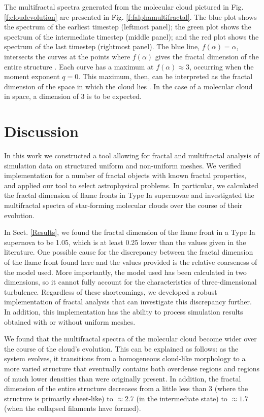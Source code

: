 \documentclass[iop]{emulateapj}
\begin{document}
The multifractal spectra generated from the molecular cloud pictured in Fig. \ref{f:cloudevolution} are presented in Fig. \ref{f:falphamultifractal}. The blue plot shows the spectrum of the earliest timestep (leftmost panel); the green plot shows the spectrum of the intermediate timestep (middle panel); and the red plot shows the spectrum of the last timestep (rightmost panel). The blue line, $f(\alpha) = \alpha $, intersects the curves at the points where $f(\alpha)$ gives the fractal dimension of the entire structure \citep{mandelbrotmultifractal}. Each curve has a maximum at $f(\alpha) \approx 3$, occurring when the moment exponent $q = 0$. This maximum, then, can be interpreted as the fractal dimension of the space in which the cloud lies \citep{Schroeder}. In the case of a molecular cloud in space, a dimension of 3 is to be expected. 

\section{Discussion}\label{Discussion}
In this work we constructed a tool allowing for fractal and multifractal analysis of simulation data on structured uniform and non-uniform meshes. We verified implementation for a number of fractal objects with known fractal properties, and applied our tool to select astrophysical problems. In particular, we calculated the fractal dimension of flame fronts in Type Ia supernovae and investigated the multifractal spectra of star-forming molecular clouds over the course of their evolution.

In Sect. \ref{Results}, we found the fractal dimension of the flame front in a Type Ia supernova to be 1.05, which is at least 0.25 lower than the values given in the literature. One possible cause for the discrepancy between the fractal dimension of the flame front found here and the values provided is the relative coarseness of the model used. More importantly, the model used has been calculated in two dimensions, so it cannot fully account for the characteristics of three-dimensional turbulence. Regardless of these shortcomings, we developed a robust implementation of fractal analysis that can investigate this discrepancy further. In addition, this implementation has the ability to process simulation results obtained with or without uniform meshes.
 
We found that the multifractal spectra of the molecular cloud become wider over the course of the cloud's evolution. This can be explained as follows: as the system evolves, it transitions from a homogeneous cloud-like morphology to a more varied structure that eventually contains both overdense regions and regions of much lower densities than were originally present. In addition, the fractal dimension of the entire structure decreases from a little less than 3 (where the structure is primarily sheet-like) to $\approx 2.7$ (in the intermediate state) to $\approx 1.7$ (when the collapsed filaments have formed).
\end{document}
